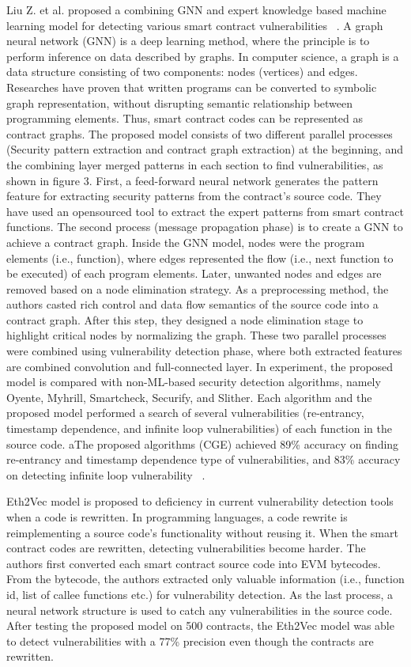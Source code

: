 Liu Z. et al. proposed a combining GNN and expert knowledge based machine learning model for detecting various smart contract vulnerabilities ~\cite{hwang2020gap}.
A graph neural network (GNN) is a deep learning method, where the principle is to perform inference on data described by graphs.
In computer science, a graph is a data structure consisting of two components: nodes (vertices) and edges. Researches have proven that written programs can be converted to symbolic graph representation,
without disrupting semantic relationship between programming elements.
Thus, smart contract codes can be represented as contract graphs.
The proposed model consists of two different parallel processes (Security pattern extraction and contract graph extraction) at the beginning,
and the combining layer merged patterns in each section to find vulnerabilities, as shown in figure 3.
First, a feed-forward neural network generates the pattern feature for extracting security patterns from the contract's source code.
They have used an opensourced tool to extract the expert patterns from smart contract functions.
The second process (message propagation phase) is to create a GNN to achieve a contract graph.
Inside the GNN model, nodes were the program elements (i.e., function), where edges represented the flow (i.e., next function to be executed) of each program elements.
Later, unwanted nodes and edges are removed based on a node elimination strategy.
As a preprocessing method, the authors casted rich control and data flow semantics of the source code into a contract graph.
After this step, they designed a node elimination stage to highlight critical nodes by normalizing the graph.
These two parallel processes were combined using vulnerability detection phase, where both extracted features are combined convolution and full-connected layer.
In experiment, the proposed model is compared with non-ML-based security detection algorithms, namely Oyente, Myhrill, Smartcheck, Securify, and Slither.
Each algorithm and the proposed model performed a search of several vulnerabilities (re-entrancy, timestamp dependence, and infinite loop vulnerabilities) of each function in the source code.
aThe proposed algorithms (CGE) achieved 89\% accuracy on finding re-entrancy and timestamp dependence type of vulnerabilities,
and 83\% accuracy on detecting infinite loop vulnerability ~\cite{hwang2020gap}.

Eth2Vec model is proposed to deficiency in current vulnerability detection tools when a code is rewritten. In programming languages,
a code rewrite is reimplementing a source code's functionality without reusing it.
When the smart contract codes are rewritten, detecting vulnerabilities become harder.
The authors first converted each smart contract source code into EVM bytecodes.
From the bytecode, the authors extracted only valuable information (i.e., function id, list of callee functions etc.) for vulnerability detection.
As the last process, a neural network structure is used to catch any vulnerabilities in the source code.
After testing the proposed model on 500 contracts, the Eth2Vec model was able to detect vulnerabilities with a 77\% precision even though the contracts are rewritten.

